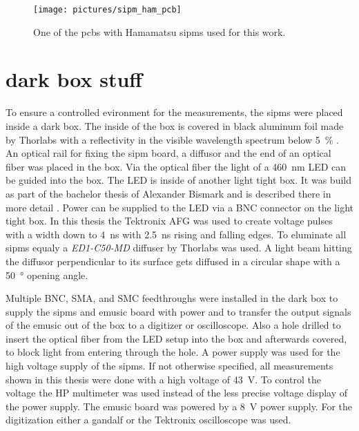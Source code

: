 \begin{figure}
	\centering
	\texttt{[image: pictures/sipm\_ham\_pcb]}
	\caption[\ac{pcb} with Hamamatsu \acp{sipm}]{One of the \acp{pcb} with Hamamatsu \acp{sipm} used for this work.}
	\label{fig:sipm_pcb}
\end{figure}

\section{dark box stuff}
To ensure a controlled evironment for the measurements, the \acp{sipm} were placed inside a dark box.
The inside of the box is covered in black aluminum foil made by Thorlabs with a reflectivity in the visible wavelength spectrum below \SI{5}{\percent} \cite{}.
An optical rail for fixing the \ac{sipm} board, a diffusor and the end of an optical fiber was placed in the box.
Via the optical fiber the light of a \SI{460}{\nano\meter} LED can be guided into the box.
The LED is inside of another light tight box.
It was build as part of the bachelor thesis of Alexander Bismark and is described there in more detail \cite{}.
Power can be supplied to the LED via a BNC connector on the light tight box.
In this thesis the Tektronix AFG was used to create voltage pulses with a width down to \SI{4}{\nano\second} with \SI{2.5}{\nano\second} rising and falling edges.
To eluminate all \acp{sipm} equaly a \textit{ED1-C50-MD} diffuser by Thorlabs was used.
A light beam hitting the diffusor perpendicular to its surface gets diffused in a circular shape with a \SI{50}{\degree} opening angle.

Multiple BNC, SMA, and SMC feedthroughs were installed in the dark box to supply the \acp{sipm} and \ac{emusic} board with power and to transfer the output signals of the \ac{emusic} out of the box to a digitizer or oscilloscope.
Also a hole drilled to insert the optical fiber from the LED setup into the box and afterwards covered, to block light from entering through the hole.
A power supply was used for the high voltage supply of the \acp{sipm}.
If not otherwise specified, all measurements shown in this thesis were done with a high voltage of \SI{43}{\volt}.
To control the voltage the HP multimeter was used instead of the less precise voltage display of the power supply.
The \ac{emusic} board was powered by a \SI{8}{\volt} power supply.
For the digitization either a \ac{gandalf} or the Tektronix oscilloscope was used.

